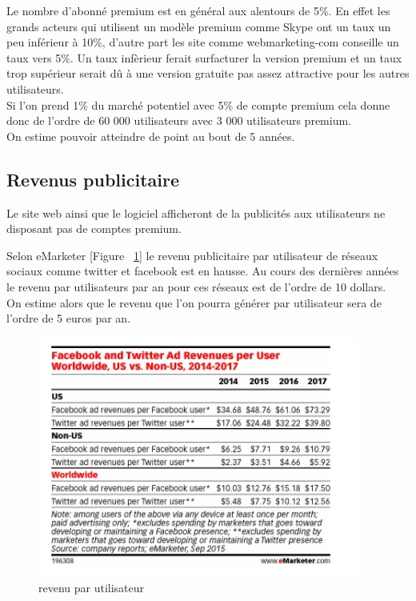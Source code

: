 \documentclass[a4,12pt]{article}
\begin{document}
Le nombre d'abonné premium est en général aux alentours de 5\%. En effet les grands acteurs qui utilisent un modèle premium comme Skype ont un taux un peu inférieur à 10\%, d'autre part les site comme webmarketing-com conseille un taux vers 5\%. Un taux infèrieur ferait surfacturer la version premium et un taux trop supérieur serait dû à une version gratuite pas assez attractive pour les autres utilisateurs.\\

Si l'on prend 1\% du marché potentiel avec 5\% de compte premium cela donne donc de l'ordre de 60 000 utilisateurs avec 3 000 utilisateurs premium.\\
On estime pouvoir atteindre de point au bout de 5 années.\\

\subsection{Revenus publicitaire}

Le site web ainsi que le logiciel afficheront de la publicités aux utilisateurs
ne disposant pas de comptes premium.

Selon eMarketer [Figure ~\ref{fig:revenu_par_utilisateur}] le revenu publicitaire par utilisateur de réseaux sociaux comme twitter et facebook est en hausse. Au cours des dernières années le revenu par utilisateurs par an pour ces réseaux est de l'ordre de 10 dollars.\\

On estime alors que le revenu que l'on pourra générer par utilisateur sera de l'ordre de 5 euros par an.

\begin{figure}[!h]
    \centering
    \includegraphics[width=300pt]{revenu_par_utilisateur.png}
    \caption{revenu par utilisateur}
    \label{fig:revenu_par_utilisateur}
\end{figure}
\end{document}
